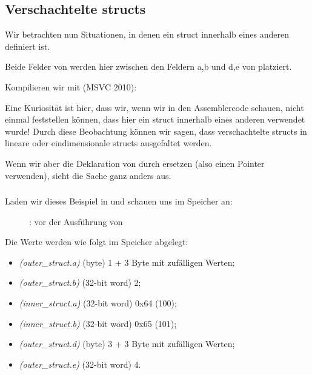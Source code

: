 \subsection{Verschachtelte structs}
Wir betrachten nun Situationen, in denen ein struct innerhalb eines anderen definiert ist.


Beide Felder von  werden hier zwischen den Feldern a,b und d,e von  platziert.

Kompilieren wir mit (MSVC 2010):



Eine Kuriosität ist hier, dass wir, wenn wir in den Assemblercode schauen, nicht einmal feststellen können, dass hier
ein struct innerhalb eines anderen verwendet wurde! Durch diese Beobachtung können wir sagen, dass verschachtelte
structs in lineare oder eindimensionale structs ausgefaltet werden.

Wenn wir aber die Deklaration von  durch  ersetzen (also einen
Pointer verwenden), sieht die Sache ganz anders aus.

\clearpage
\subsubsection{\olly}
\myindex{\olly}
Laden wir dieses Beispiel in \olly und schauen uns  im Speicher an:

\begin{figure}[H]
\centering
{}
\caption{\olly: vor der Ausführung von \printf}
\label{fig:nested_olly}
\end{figure}
Die Werte werden wie folgt im Speicher abgelegt:
\begin{itemize}
\item \emph{(outer\_struct.a)} (byte) 1 + 3 Byte mit zufälligen Werten;
\item \emph{(outer\_struct.b)} (32-bit word) 2;
\item \emph{(inner\_struct.a)} (32-bit word) 0x64 (100);
\item \emph{(inner\_struct.b)} (32-bit word) 0x65 (101);
\item \emph{(outer\_struct.d)} (byte) 3 + 3 Byte mit zufälligen Werten;
\item \emph{(outer\_struct.e)} (32-bit word) 4.
\end{itemize}

